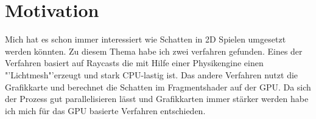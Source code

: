 \chapter{Motivation}
Mich hat es schon immer interessiert wie Schatten in 2D Spielen umgesetzt werden könnten.
Zu diesem Thema habe ich zwei verfahren gefunden. Eines der Verfahren basiert auf Raycasts die mit Hilfe einer Physikengine einen "'Lichtmesh"'erzeugt und stark CPU-lastig ist. Das andere Verfahren nutzt die Grafikkarte und berechnet die Schatten im Fragmentshader auf der GPU.
Da sich der Prozess gut parallelisieren lässt und Grafikkarten immer stärker werden habe ich mich für das GPU basierte Verfahren entschieden. 
